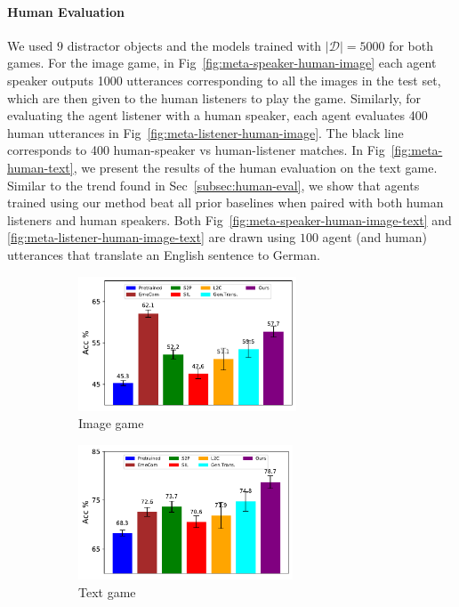 \documentclass{article}
\begin{document}
\paragraph{Human Evaluation}
We used $9$ distractor objects and the models trained with $|\mathcal{D}|=5000$ for both games. For the image game, in Fig~\ref{fig:meta-speaker-human-image} each agent speaker outputs 1000 utterances corresponding to all the images in the test set, which are then given to the human listeners to play the game. Similarly, for evaluating the agent listener with a human speaker, each agent evaluates 400 human utterances in Fig~\ref{fig:meta-listener-human-image}. The black line corresponds to 400 human-speaker vs human-listener matches. In Fig~\ref{fig:meta-human-text}, we present the results of the human evaluation on the text game. Similar to the trend found in Sec~\ref{subsec:human-eval}, we show that agents trained using our method beat all prior baselines when paired with both human listeners and human speakers. Both Fig~\ref{fig:meta-speaker-human-image-text} and \ref{fig:meta-listener-human-image-text} are drawn using $100$ agent (and human) utterances that translate an English sentence to German.

\begin{figure}
    \centering
    \begin{subfigure}{0.49\linewidth}
    \includegraphics[width=\linewidth, height=4cm]{figs/meta-agents-image-2k.pdf}
    \caption{Image game}
    \label{fig:meta-agents-image-2k}
    \end{subfigure}%
    \begin{subfigure}{0.49\linewidth}
    \includegraphics[width=\linewidth, height=4cm]{figs/meta-agents-text-9.pdf}
    \caption{Text game}
    \label{fig:meta-agents-text-9}
    \end{subfigure}
    \caption{}
\end{figure}
\end{document}
